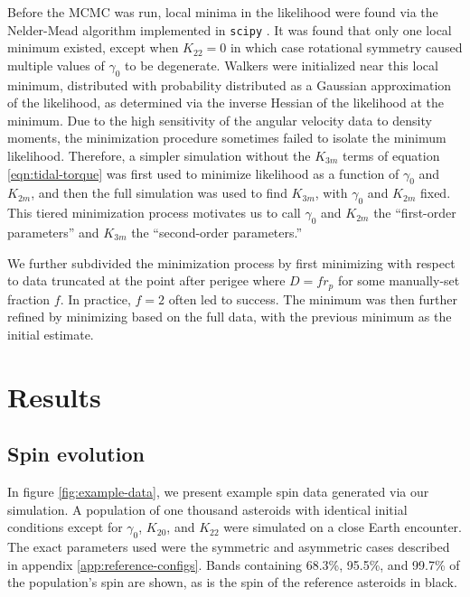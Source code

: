 \documentclass[fleqn,usenatbib]{mnras}
\begin{document}
Before the MCMC was run, local minima in the likelihood were found via the Nelder-Mead algorithm implemented in \texttt{scipy} \cite{Gao2012}. It was found that only one local minimum existed, except when $K_{22}=0$ in which case rotational symmetry caused multiple values of $\gamma_0$ to be degenerate. Walkers were initialized near this local minimum, distributed with probability distributed as a Gaussian approximation of the likelihood, as determined via the inverse Hessian of the likelihood at the minimum. Due to the high sensitivity of the angular velocity data to density moments, the minimization procedure sometimes failed to isolate the minimum likelihood. Therefore, a simpler simulation without the $K_{3m}$ terms of equation \ref{eqn:tidal-torque} was first used to minimize likelihood as a function of $\gamma_0$ and $K_{2m}$, and then the full simulation was used to find $K_{3m}$, with $\gamma_0$ and $K_{2m}$ fixed. This tiered minimization process motivates us to call $\gamma_0$ and $K_{2m}$ the ``first-order parameters'' and $K_{3m}$ the ``second-order parameters.''

We further subdivided the minimization process by first minimizing with respect to data truncated at the point after perigee where $D=fr_p$ for some manually-set fraction $f$. In practice, $f=2$ often led to success. The minimum was then further refined by minimizing based on the full data, with the previous minimum as the initial estimate.





\section{Results}
\label{sec:results}

\subsection{Spin evolution}

In figure \ref{fig:example-data}, we present example spin data generated via our simulation. A population of one thousand asteroids with identical initial conditions except for $\gamma_0$, $K_{20}$, and $K_{22}$ were simulated on a close Earth encounter. The exact parameters used were the symmetric and asymmetric cases described in appendix \ref{app:reference-configs}. Bands containing 68.3\%, 95.5\%, and 99.7\% of the population's spin are shown, as is the spin of the reference asteroids in black.
\end{document}
